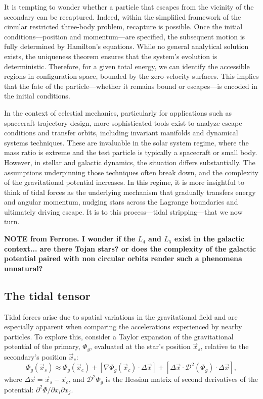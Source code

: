         It is tempting to wonder whether a particle that escapes from the vicinity of the secondary can be recaptured. Indeed, within the simplified framework of the circular restricted three-body problem, recapture is possible. Once the initial conditions—position and momentum—are specified, the subsequent motion is fully determined by Hamilton's equations. While no general analytical solution exists, the uniqueness theorem ensures that the system's evolution is deterministic. Therefore, for a given total energy, we can identify the accessible regions in configuration space, bounded by the zero-velocity surfaces. This implies that the fate of the particle—whether it remains bound or escapes—is encoded in the initial conditions.

        In the context of celestial mechanics, particularly for applications such as spacecraft trajectory design, more sophisticated tools exist to analyze escape conditions and transfer orbits, including invariant manifolds and dynamical systems techniques. These are invaluable in the solar system regime, where the mass ratio is extreme and the test particle is typically a spacecraft or small body. However, in stellar and galactic dynamics, the situation differs substantially. The assumptions underpinning those techniques often break down, and the complexity of the gravitational potential increases. In this regime, it is more insightful to think of tidal forces as the underlying mechanism that gradually transfers energy and angular momentum, nudging stars across the Lagrange boundaries and ultimately driving escape. It is to this process—tidal stripping—that we now turn.


        \textbf{NOTE from Ferrone. I wonder if the $L_4$ and $L_5$ exist in the galactic context... are there Tojan stars? or does the complexity of the galactic potential paired with non circular orbits render such a phenomena unnatural?}

    \subsection{The tidal tensor}
        Tidal forces arise due to spatial variations in the gravitational field and are especially apparent when comparing the accelerations experienced by nearby particles. To explore this, consider a Taylor expansion of the gravitational potential of the primary, \(\Phi_g\), evaluated at the star's position \(\vec{x}_s\), relative to the secondary's position \(\vec{x}_c\):
        \begin{equation}
            \Phi_g\left(\vec{x}_s\right) \approx \Phi_g\left(\vec{x}_c\right) + \left[\nabla \Phi_g (\vec{x}_c)\cdot \Delta \vec{x}\right] + \left[\Delta \vec{x} \cdot \mathcal{D}^2\left(\Phi_g\right) \cdot \Delta\vec{x}\right],
        \end{equation}
        where \(\Delta \vec{x} = \vec{x}_s - \vec{x}_c\), and \(\mathcal{D}^2 \Phi_g\) is the Hessian matrix of second derivatives of the potential: \(\partial^2 \Phi/\partial x_i \partial x_j\).


